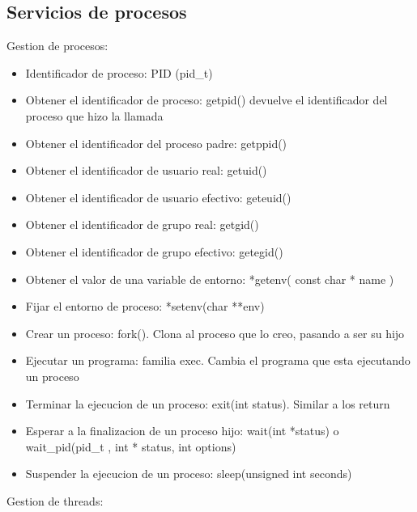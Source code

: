 \documentclass[12pt, letterpaper]{article}
\begin{document}
\subsection{Servicios de procesos}

Gestion de procesos:

\begin{itemize}
	\item{Identificador de proceso: PID (pid\_t)}
	\item{Obtener el identificador de proceso: getpid() devuelve el identificador del proceso que hizo la llamada}
	\item{Obtener el identificador del proceso padre: getppid()}
	\item{Obtener el identificador de usuario real: getuid()}
	\item{Obtener el identificador de usuario efectivo: geteuid()}
	\item{Obtener el identificador de grupo real: getgid()}
	\item{Obtener el identificador de grupo efectivo: getegid()}
	\item{Obtener el valor de una variable de entorno: *getenv( const char * name )}
	\item{Fijar el entorno de proceso: *setenv(char **env)}
	\item{Crear un proceso: fork(). Clona al proceso que lo creo, pasando a ser su hijo}
	\item{Ejecutar un programa: familia exec. Cambia el programa que esta ejecutando un proceso}
	\item{Terminar la ejecucion de un proceso: exit(int status). Similar a los return}
	\item{Esperar a la finalizacion de un proceso hijo: wait(int *status) o wait\_pid(pid\_t , int * status, int options)}
	\item{Suspender la ejecucion de un proceso: sleep(unsigned int seconds)}
\end{itemize}

Gestion de threads:
\end{document}
